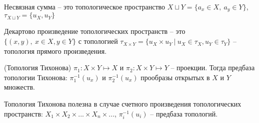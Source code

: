 \begin{definition}
    Несвязная сумма -- это топологическое пространство $X \sqcup Y = \{a_x \in X,\ a_y \in Y\}$, $\tau_{X \sqcup Y} = \{u_X, u_Y\}$  
\end{definition}

\begin{definition}
    Декартово произведение топологических пространств -- это $\{(x, y),\ x \in X, y\in Y\}$ с топологией $\tau_{X \times Y} = \{u_X \times u_Y\ |\ u_X \in \tau_X, u_Y \in \tau_Y\}$ -- топология прямого произведения.
\end{definition}

\begin{definition}
    (Топология Тихонова) $\pi_1:X\times Y \mapsto X$ и $\pi_2:X\times Y \mapsto Y$ -- проекции. Тогда предбаза топологии Тихонова: $\pi_1^{-1}(u_x)$ и $\pi_2^{-1}(u_x)$ прообразы открытых в $X$ и $Y$ множеств. 
\end{definition}

\begin{nota_bene}
    Топология Тихонова полезна в случае счетного произведения топологических пространств: $X_1 \times X_2 \times ... \times X_n \times ...$, $\pi_i^{-1}(u_i)$ -- предбаза топологий.
\end{nota_bene}